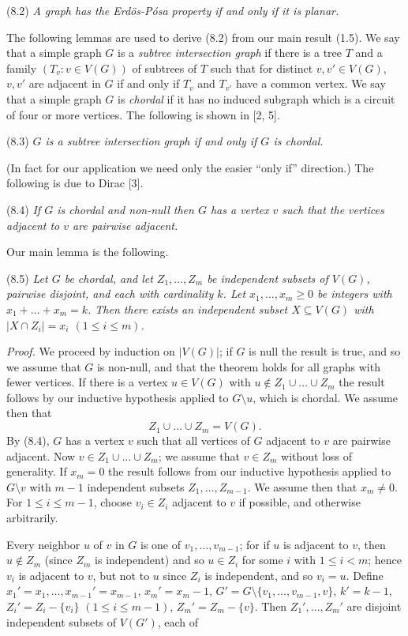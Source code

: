 \stmt
(8.2) \textit{A graph has the Erd\"os-P\'osa property if and only if it is planar.}

The following lemmas are used to derive (8.2) from our main result (1.5). We say that a simple graph $G$ is a \textit{subtree intersection graph} if there is a tree $T$ and a family $(T_v : v \in V(G))$ of subtrees of $T$ such that for distinct $v, v' \in V(G)$, $v, v'$ are adjacent in $G$ if and only if $T_v$ and $T_{v'}$ have a common vertex. We say that a simple graph $G$ is \textit{chordal} if it has no induced subgraph which is a circuit of four or more vertices. The following is shown in [2, 5].

\stmt
(8.3) \textit{$G$ is a subtree intersection graph if and only if $G$ is chordal.}

(In fact for our application we need only the easier ``only if'' direction.) The following is due to Dirac [3].

\stmt
(8.4) \textit{If $G$ is chordal and non-null then $G$ has a vertex $v$ such that the vertices adjacent to $v$ are pairwise adjacent.}

Our main lemma is the following.

\stmt
(8.5) \textit{Let $G$ be chordal, and let $Z_1, \dots, Z_m$ be independent subsets of $V(G)$, pairwise disjoint, and each with cardinality $k$. Let $x_1, \dots, x_m \ge 0$ be integers with $x_1 + \dots + x_m = k$. Then there exists an independent subset $X \subseteq V(G)$ with $|X \cap Z_i| = x_i$ $(1 \le i \le m)$.}

\textit{Proof.} We proceed by induction on $|V(G)|$; if $G$ is null the result is true, and so we assume that $G$ is non-null, and that the theorem holds for all graphs with fewer vertices. If there is a vertex $u \in V(G)$ with $u \notin Z_1 \cup \dots \cup Z_m$ the result follows by our inductive hypothesis applied to $G \setminus u$, which is chordal. We assume then that
\begin{equation*}
Z_1 \cup \dots \cup Z_m = V(G).
\end{equation*}
By (8.4), $G$ has a vertex $v$ such that all vertices of $G$ adjacent to $v$ are pairwise adjacent. Now $v \in Z_1 \cup \dots \cup Z_m$; we assume that $v \in Z_m$ without loss of generality. If $x_m = 0$ the result follows from our inductive hypothesis applied to $G \setminus v$ with $m - 1$ independent subsets $Z_1, \dots, Z_{m-1}$. We assume then that $x_m \ne 0$. For $1 \le i \le m - 1$, choose $v_i \in Z_i$ adjacent to $v$ if possible, and otherwise arbitrarily.

Every neighbor $u$ of $v$ in $G$ is one of $v_1, \dots, v_{m-1}$; for if $u$ is adjacent to $v$, then $u \notin Z_m$ (since $Z_m$ is independent) and so $u \in Z_i$ for some $i$ with $1 \le i < m$; hence $v_i$ is adjacent to $v$, but not to $u$ since $Z_i$ is independent, and so $v_i = u$. Define $x_1' = x_1, \dots, x_{m-1}' = x_{m-1}$, $x_m' = x_m - 1$, $G' = G \setminus \{v_1, \dots, v_{m-1}, v\}$, $k' = k - 1$, $Z_i' = Z_i - \{v_i\}$ $(1 \le i \le m - 1)$, $Z_m' = Z_m - \{v\}$. Then $Z_1', \dots, Z_m'$ are disjoint independent subsets of $V(G')$, each of
